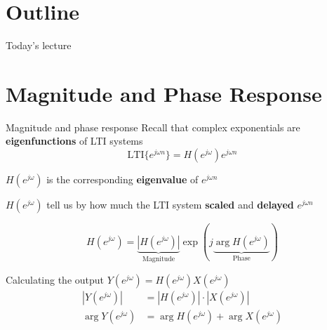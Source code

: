 \documentclass[10pt, handout]{beamer}
\begin{document}
\section{Outline}
%
\begin{frame}{Today's lecture}
\tableofcontents
\end{frame}

%
\section{Magnitude and Phase Response}
\begin{frame}{Magnitude and phase response}
Recall that complex exponentials are \textbf{eigenfunctions} of LTI systems
\begin{equation*}
\mathrm{LTI}\{e^{j\omega n}\} = H(e^{j\omega})e^{j\omega n}
\end{equation*}

$H(e^{j\omega})$ is the corresponding \textbf{eigenvalue} of $e^{j\omega n}$

$H(e^{j\omega})$ tell us by how much the LTI system \textbf{scaled} and \textbf{delayed} $e^{j\omega n}$

\begin{equation*}
H(e^{j\omega}) = \underbrace{|H(e^{j\omega})|}_{\text{Magnitude}}\exp(j\underbrace{\arg H(e^{j\omega})}_{\text{Phase}}) \tag{polar coordinates}
\end{equation*}

\pause
Calculating the output $Y(e^{j\omega}) = H(e^{j\omega})X(e^{j\omega})$
\begin{align*}
|Y(e^{j\omega})| &= |H(e^{j\omega})|\cdot|X(e^{j\omega})| \tag{magnitudes multiply} \\ 
\arg Y(e^{j\omega}) &= \arg H(e^{j\omega}) + \arg X(e^{j\omega}) \tag{phases add}
\end{align*} 
\end{frame}
\end{document}
